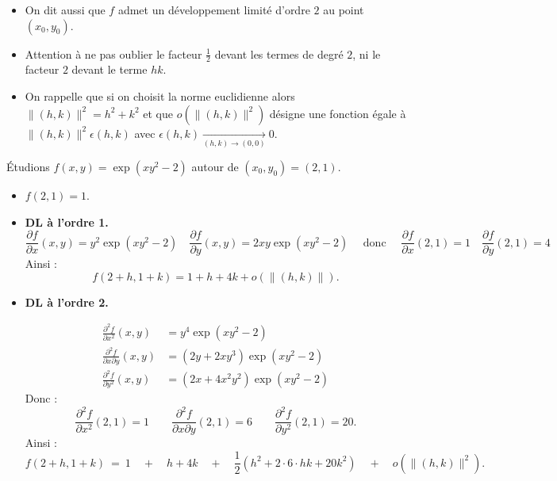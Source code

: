 \begin{itemize}
    \item On dit aussi que $f$ admet un développement limité d'ordre $2$ au point $(x_0,y_0)$.

    \item Attention à ne pas oublier le facteur $\frac12$ devant les termes de degré $2$, ni le facteur $2$ devant le terme $hk$.
    
    \item On rappelle que si on choisit la norme euclidienne alors $\|(h,k)\|^2 = h^2+k^2$ et que $o\left(\|(h,k)\|^2\right)$ désigne une fonction égale à $\|(h,k)\|^2 \epsilon(h,k)$ avec $\epsilon(h,k) 
    \xrightarrow[(h,k)\to (0,0)]{} 0.$


\end{itemize}



\begin{exemple}{}{}
Étudions $f(x,y) = \exp(xy^2-2)$ autour de $(x_0,y_0) = (2,1)$.
\begin{itemize}
    \item $f(2,1) = 1$.
    
    \item \textbf{DL à l'ordre 1.}
    $$\frac{\partial f}{\partial x}(x,y) = y^2\exp(xy^2-2)
    \quad
    \frac{\partial f}{\partial y}(x,y) = 2xy\exp(xy^2-2)
    \quad\text{ donc }\quad
    \frac{\partial f}{\partial x}(2,1) = 1
    \quad
    \frac{\partial f}{\partial y}(2,1) = 4$$
    Ainsi :
    $$f(2+h,1+k) = 1 + h + 4k + o\left(\|(h,k)\|\right).$$
  
    \item \textbf{DL à l'ordre 2.} 
    
    \begin{align*}
    \frac{\partial ^2f}{\partial x^2}(x,y) &= y^4\exp(xy^2-2) \\
    \frac{\partial ^2f}{\partial x\partial y}(x,y) &= (2y+2xy^3)\exp(xy^2-2)\\
    \frac{\partial ^2f}{\partial y^2}(x,y) &= (2x+4x^2y^2)\exp(xy^2-2)
    \end{align*}
    Donc :
    $$\frac{\partial ^2f}{\partial x^2}(2,1) = 1\qquad 
    \frac{\partial ^2f}{\partial x\partial y}(2,1) = 6 \qquad
    \frac{\partial ^2f}{\partial y^2}(2,1) = 20.$$ 
    Ainsi :
    $$   
    f(2+h,1+k)  \ 
    = \  1 \quad + \quad h + 4k
    \quad +\quad
    \frac12\left(h^2
    +2\cdot 6 \cdot hk
    +20 k^2\right)
    \quad + \quad o\left(\|(h,k)\|^2\right).$$

\end{itemize}    
       
\end{exemple}    



